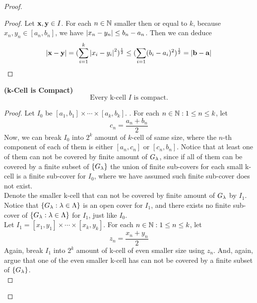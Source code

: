 \documentclass{report}
\begin{document}
\begin{proof}
\begin{lemma}
\end{lemma}
\begin{proof}
Let $\textbf{x},\textbf{y}\in I$. For each $n\in\mathbb{N}$ smaller then or equal to $k$,  because $x_n,y_n\in [a_n,b_n]$, we have $\left|x_n-y_n\right|\leq b_n-a_n$. Then we can deduce
\begin{equation}
\left|\textbf{x}-\textbf{y}\right|=(\sum_{i=1}^k \left|x_i-y_i\right|^2)^{\frac{1}{2}}\leq (\sum_{i=1} (b_i-a_i)^2)^{\frac{1}{2}}=\left|\textbf{b}-\textbf{a}\right|
\end{equation}
\end{proof}
\begin{theorem}
\label{1.12.4}
\textbf{(k-Cell is Compact)} 
\begin{equation}
\text{ Every k-cell $I$ is compact. }
\end{equation}
\end{theorem}
\begin{proof}
Let $I_0$ be $[a_1,b_1]\times \cdots \times [a_k,b_k]$. . For each $n\in\mathbb{N}: 1\leq n\leq k$, let 
\begin{equation}
c_n=\frac{a_n+b_n}{2}
\end{equation}
Now, we can break $I_0$ into  $2^k$ amount of  $k$-cell of same size, where the $n$-th component of each of them is either  $[a_n,c_n]$ or $[c_n,b_n]$. Notice that at least one of them can not be covered by finite amount of $G_\lambda$, since if all of them can be covered by a finite subset of $\{ G_\lambda \}$ the union of finite sub-covers for each small k-cell is a finite sub-cover for $I_0$, where we have assumed such finite sub-cover does not exist.\\

Denote the smaller k-cell that can not be covered by finite amount of $G_\lambda$ by $I_1$. Notice that $\{ G_\lambda:\lambda\in\Lambda   \}$ is an open cover for $I_1$, and there exists no finite sub-cover of $\{ G_\lambda :\lambda\in \Lambda  \}$ for $I_1$, just like  $I_0$.\\

Let $I_1=[x_1,y_1]\times\cdots\times[x_k,y_k]$. For each $n\in\mathbb{N}:1\leq n\leq k$, let
\begin{equation}
z_n=\frac{x_n+y_n}{2}
\end{equation}
Again, break  $I_1$ into  $2^k$ amount of k-cell of even smaller size using $z_n$. And, again, argue that one of the even smaller k-cell has can not be covered by a finite subset of $\{ G_\lambda  \}$.\\


\end{proof}
\end{proof}
\end{document}

